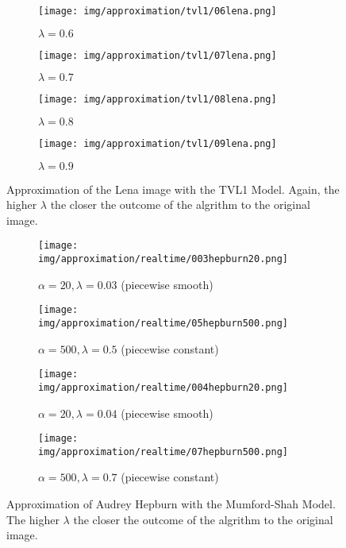 \begin{figure}[ht]
    \centering
    \begin{subfigure}[b]{0.4\textwidth}
        \texttt{[image: img/approximation/tvl1/06lena.png]}
        \caption{$\lambda = 0.6$}
    \end{subfigure}
    \begin{subfigure}[b]{0.4\textwidth}
        \texttt{[image: img/approximation/tvl1/07lena.png]}
        \caption{$\lambda = 0.7$}
    \end{subfigure}
    \begin{subfigure}[b]{0.4\textwidth}
        \texttt{[image: img/approximation/tvl1/08lena.png]}
        \caption{$\lambda = 0.8$}
    \end{subfigure}
    \begin{subfigure}[b]{0.4\textwidth}
        \texttt{[image: img/approximation/tvl1/09lena.png]}
        \caption{$\lambda = 0.9$}
    \end{subfigure}
    \caption{Approximation of the Lena image with the TVL1 Model. Again, the higher $\lambda$ the closer the outcome of the algrithm to the original image.}
\label{fig:tvl1_lena_compare}
\end{figure}

\begin{figure}[ht]
    \centering
    \begin{subfigure}[b]{0.45\textwidth}
        \texttt{[image: img/approximation/realtime/003hepburn20.png]}
        \caption{$\alpha = 20, \lambda = 0.03$ (piecewise smooth)}
    \end{subfigure}
    \begin{subfigure}[b]{0.45\textwidth}
        \texttt{[image: img/approximation/realtime/05hepburn500.png]}
        \caption{$\alpha = 500, \lambda = 0.5$ (piecewise constant)}
    \end{subfigure}
    \begin{subfigure}[b]{0.45\textwidth}
        \texttt{[image: img/approximation/realtime/004hepburn20.png]}
        \caption{$\alpha = 20, \lambda = 0.04$ (piecewise smooth)}
    \end{subfigure}
    \begin{subfigure}[b]{0.45\textwidth}
        \texttt{[image: img/approximation/realtime/07hepburn500.png]}
        \caption{$\alpha = 500, \lambda = 0.7$ (piecewise constant)}
    \end{subfigure}
    \caption{Approximation of Audrey Hepburn with the Mumford-Shah Model. The higher $\lambda$ the closer the outcome of the algrithm to the original image.}
\label{fig:realtime_hepburn_compare}
\end{figure}

